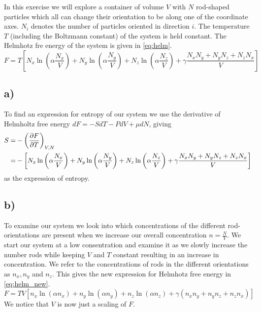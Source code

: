 In this exercise we will explore a container of volume $V$ with $N$ rod-shaped particles which all can change their orientation to be along one of the coordinate axes. $N_i$ denotes the number of particles oriented in direction $i$. The temperature $T$ (including the Boltzmann constant) of the system is held constant. The Helmhotz fre energy of the system is given in \cref{eq:helm}.
\begin{equation}
    F=T\left[N_x \ln \left(\alpha \frac{N_x}{V}\right)+N_y \ln \left(\alpha \frac{N_y}{V}\right)+N_z \ln \left(\alpha \frac{N_z}{V}\right)+\gamma \frac{N_x N_y+N_y N_z+N_z N_x}{V}\right]
    \label{eq:helm}
\end{equation}


\subsection*{a)}
    To find an expression for entropy of our system we use the derivative of Helmholtz free energy $dF = -SdT - PdV + \mu dN$, giving 
    \begin{align}
        S =& - \left(\pdv{F}{T}\right)_{V, N}\\
         =& -\left[ N_x \ln \left(\alpha \frac{N_x}{V}\right)+N_y \ln \left(\alpha \frac{N_y}{V}\right)+N_z \ln \left(\alpha \frac{N_z}{V}\right)+\gamma \frac{N_x N_y+N_y N_z+N_z N_x}{V} \right]
    \label{eq:entropy}
    \end{align}
    as the expression of entropy.


\subsection*{b)}
    To examine our system we look into which concentrations of the different rod-orientations are present when we increase our overall concentration $n = \frac{N}{V}$. We start our system at a low consentration and examine it as we slowly increase the number rods while keeping $V$ and $T$ constant resulting in an increase in concentration. We refer to the concentrations of rods in the different orientations as $n_x, n_y$ and $n_z$. This gives the new expression for Helmhotz free energy in \cref{eq:helm_new}.   
    \begin{equation}
        F=TV\left[n_x \ln \left(\alpha n_x\right)+n_y \ln \left(\alpha n_y\right)+n_z \ln \left(\alpha n_z\right)+\gamma (n_x n_y+n_y n_z+n_z n_x)\right]
        \label{eq:helm_new}
    \end{equation}
    We notice that $V$ is now just a scaling of $F$.

